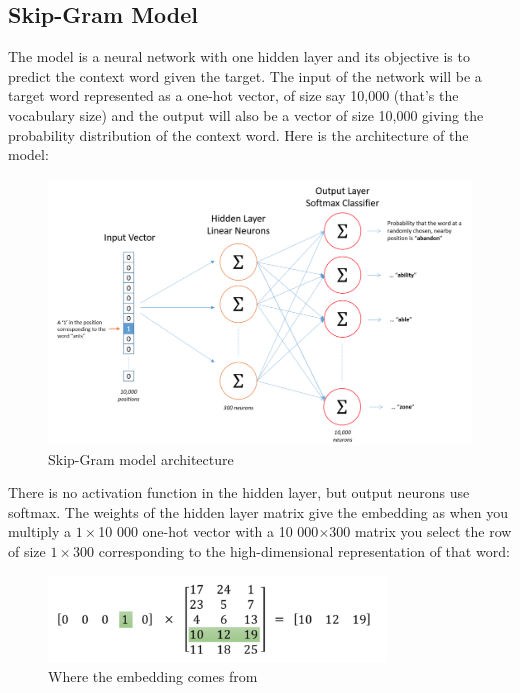 \subsection{Skip-Gram Model}
The model is a neural network with one hidden layer and its objective is to predict the context word given the target. The input of the network will be a target word represented as a one-hot vector, of size say 10,000 (that's the vocabulary size) and the output will also be a vector of size 10,000 giving the probability distribution of the context word. Here is the architecture of the model:

\begin{figure}[H]
    \centering
    \includegraphics[width=\textwidth]{Images/word2vec-architecture.png}
    \caption{Skip-Gram model architecture \cite{word2vec-architecture}}
\end{figure}

There is no activation function in the hidden layer, but output neurons use softmax. The weights of the hidden layer matrix give the embedding as when you multiply a $1\times$10 000 one-hot vector with a 10 000$\times300$ matrix you select the row of size $1\times300$ corresponding to the high-dimensional representation of that word: 

\begin{figure}[H]
    \centering
    \includegraphics[width=0.8\textwidth]{Images/onehot-matrix.png}
    \caption{Where the embedding comes from \cite{word2vec-architecture}}
\end{figure}

